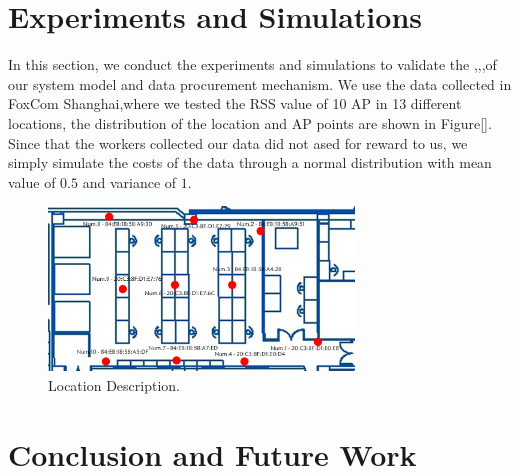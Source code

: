 \documentclass[10pt,conference,compsocconf,letterpaper]{IEEEtran}
\begin{document}
\section{Experiments and Simulations}\label{exp&sim}
In this section, we conduct the experiments and simulations to validate the ,,,of our system model and data procurement mechanism. We use the data collected in FoxCom Shanghai,where we tested the RSS value of 10 AP in 13 different locations, the distribution of the location and AP points are shown in Figure\ref{}. Since that the workers collected our data did not ased for reward to us, we simply simulate the costs of the data through a normal distribution with mean value of $0.5$ and variance of $1$.
\begin{figure}[htbp]
\centering
\includegraphics[width =230pt ,keepaspectratio ]{exp-loc.png}
\caption{Location Description.}
\label{fig:exp-loc}
\end{figure}

\section{Conclusion and Future Work}\label{concandfuture}





%
\end{document}
